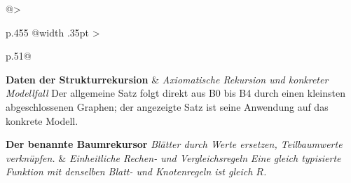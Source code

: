 \begin{longtable}{@{}>{\raggedright\arraybackslash}p{.455\linewidth}%
  @{\hspace{.012\linewidth}\vrule width .35pt\hspace{.012\linewidth}}%
  >{\raggedright\arraybackslash}p{.51\linewidth}@{}}
\textbf{Daten der Strukturrekursion}
&
\textit{Axiomatische Rekursion und konkreter Modellfall}
Der allgemeine Satz folgt direkt aus B0 bis B4 durch einen kleinsten
abgeschlossenen Graphen; der angezeigte Satz ist seine Anwendung
auf das konkrete Modell.\\
\addlinespace[.8ex]

\textbf{Der benannte Baumrekursor}
\textit{Blätter durch Werte ersetzen, Teilbaumwerte verknüpfen.}
&
\textit{Einheitliche Rechen- und Vergleichsregeln}
\textit{Eine gleich typisierte Funktion mit denselben Blatt- und
Knotenregeln ist gleich \(R\).}
\\
\addlinespace[.8ex]


\end{longtable}
